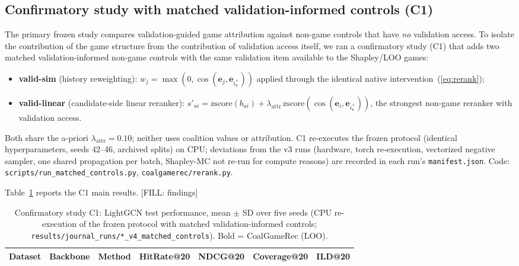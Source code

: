 
\subsection{Confirmatory study with matched validation-informed controls (C1)}\label{subsec:c1}

The primary frozen study compares validation-guided game attribution against non-game controls that have \emph{no} validation access. To isolate the contribution of the game structure from the contribution of validation access itself, we ran a confirmatory study (C1) that adds two matched validation-informed non-game controls with the same validation item available to the Shapley/LOO games:
\begin{itemize}
    \item \textbf{valid-sim} (history reweighting): $w_j = \max(0, \cos(\mathbf{e}_j, \mathbf{e}_{i_u^+}))$ applied through the identical native intervention~(\ref{eq:rerank});
    \item \textbf{valid-linear} (candidate-side linear reranker): $s'_{ui} = \mathrm{zscore}(b_{ui}) + \lambda_{\text{attr}}\,\mathrm{zscore}(\cos(\mathbf{e}_i, \mathbf{e}_{i_u^+}))$, the strongest non-game reranker with validation access.
\end{itemize}
Both share the a-priori $\lambda_{\text{attr}}=0.10$; neither uses coalition values or attribution. C1 re-executes the frozen protocol (identical hyperparameters, seeds 42--46, archived splits) on CPU; deviations from the v3 runs (hardware, torch re-execution, vectorized negative sampler, one shared propagation per batch, Shapley-MC not re-run for compute reasons) are recorded in each run's \texttt{manifest.json}. Code: \texttt{scripts/run\_matched\_controls.py}, \texttt{coalgamerec/rerank.py}.

Table~\ref{tab:c1_main} reports the C1 main results. [FILL: findings]

\begin{table}[t]
\caption{Confirmatory study C1: LightGCN test performance, mean $\pm$ SD over five seeds (CPU re-execution of the frozen protocol with matched validation-informed controls; \texttt{results/journal\_runs/*\_v4\_matched\_controls}). Bold = CoalGameRec (LOO).}\label{tab:c1_main}
\centering
\scriptsize
\begin{tabular}{lllllll}
\toprule
Dataset & Backbone & Method & HitRate@20 & NDCG@20 & Coverage@20 & ILD@20 \\
\midrule
\bottomrule
\end{tabular}
\end{table}

